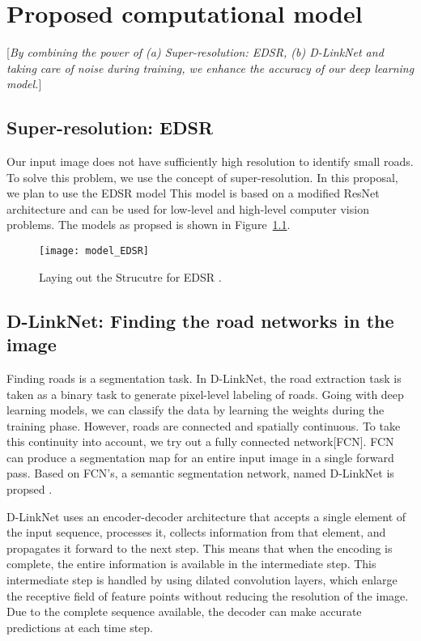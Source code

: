 \chapter{Proposed computational model}\label{chapt:model}
[\textit{By combining the power of (a) Super-resolution: EDSR, (b) D-LinkNet and taking care of noise during training, we enhance the accuracy of our deep learning model.}]

\section{Super-resolution: EDSR}
Our input image does not have sufficiently high resolution to identify small roads. To solve this problem, we use the concept of super-resolution. In this proposal, we plan to use the EDSR model \cite{EDSR}
This model is based on a modified ResNet architecture and can be used for low-level and high-level computer vision problems. The models as propsed \cite{EDSR} is shown in Figure~\ref{fig:model_EDSR}.

\begin{figure}[h!]
  \centering
  \texttt{[image: model\_EDSR]}
  \caption{Laying out the Strucutre for EDSR \cite{EDSR}.}
  \label{fig:model_EDSR}
\end{figure}

\section{D-LinkNet: Finding the road networks in the image}
Finding roads is a segmentation task. In D-LinkNet, the road extraction task is taken as a binary task to generate pixel-level labeling of roads. Going with deep learning models, we can classify the data by learning the weights during the training phase. However, roads are connected and spatially continuous. To take this continuity into account, we try out a fully connected network[FCN]. FCN can produce a segmentation map for an entire input image in a single forward pass. Based on FCN's, a semantic segmentation network, named D-LinkNet is propsed \cite{D-LinkNet}.

D-LinkNet uses an encoder-decoder architecture that accepts a single element of the input sequence, processes it, collects information from that element, and propagates it forward to the next step. This means that when the encoding is complete, the entire information is available in the intermediate step. This intermediate step is handled by using dilated convolution layers, which enlarge the receptive field of feature points without reducing the resolution of the image. Due to the complete sequence available, the decoder can make accurate predictions at each time step.

